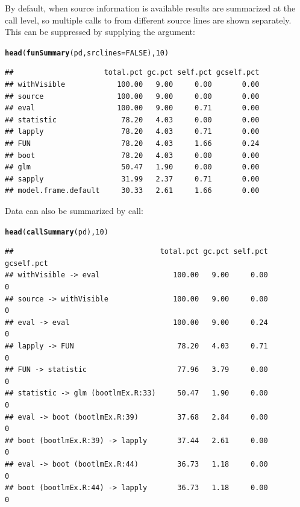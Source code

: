 \documentclass[nojss]{jss}\usepackage[]{graphicx}\usepackage[]{color}
\makeatletter
\newcommand{\hlnum}[1]{\textcolor[rgb]{0.686,0.059,0.569}{#1}}%
\newcommand{\hlstd}[1]{\textcolor[rgb]{0.345,0.345,0.345}{#1}}%
\newcommand{\hlkwc}[1]{\textcolor[rgb]{0.333,0.667,0.333}{#1}}%
\newcommand{\hlkwd}[1]{\textcolor[rgb]{0.737,0.353,0.396}{\textbf{#1}}}%
\newenvironment{kframe}{%
 \def\at@end@of@kframe{}%
 \ifinner\ifhmode%
  \def\at@end@of@kframe{\end{minipage}}%
  \begin{minipage}{\columnwidth}%
 \fi\fi%
 \def\FrameCommand##1{\hskip\@totalleftmargin \hskip-\fboxsep
 \colorbox{shadecolor}{##1}\hskip-\fboxsep
     \hskip-\linewidth \hskip-\@totalleftmargin \hskip\columnwidth}%
 \MakeFramed {\advance\hsize-\width
   \@totalleftmargin\z@ \linewidth\hsize
   \@setminipage}}%
 {\par\unskip\endMakeFramed%
 \at@end@of@kframe}
\newenvironment{knitrout}{}{} %
\makeatother
\begin{document}
By default, when source information is available results are
summarized at the call level, so multiple calls to  from
different source lines are shown separately. This can be suppressed by
supplying the  argument:
\begin{knitrout}\small
{}\color{fgcolor}\begin{kframe}
\begin{alltt}
\hlkwd{head}\hlstd{(}\hlkwd{funSummary}\hlstd{(pd,} \hlkwc{srclines} \hlstd{=} \hlnum{FALSE}\hlstd{),} \hlnum{10}\hlstd{)}
\end{alltt}
\begin{verbatim}
##                     total.pct gc.pct self.pct gcself.pct
## withVisible            100.00   9.00     0.00       0.00
## source                 100.00   9.00     0.00       0.00
## eval                   100.00   9.00     0.71       0.00
## statistic               78.20   4.03     0.00       0.00
## lapply                  78.20   4.03     0.71       0.00
## FUN                     78.20   4.03     1.66       0.24
## boot                    78.20   4.03     0.00       0.00
## glm                     50.47   1.90     0.00       0.00
## sapply                  31.99   2.37     0.71       0.00
## model.frame.default     30.33   2.61     1.66       0.00
\end{verbatim}
\end{kframe}
\end{knitrout}

Data can also be summarized by call:
\begin{knitrout}\small
{}\color{fgcolor}\begin{kframe}
\begin{alltt}
\hlkwd{head}\hlstd{(}\hlkwd{callSummary}\hlstd{(pd),} \hlnum{10}\hlstd{)}
\end{alltt}
\begin{verbatim}
##                                  total.pct gc.pct self.pct gcself.pct
## withVisible -> eval                 100.00   9.00     0.00          0
## source -> withVisible               100.00   9.00     0.00          0
## eval -> eval                        100.00   9.00     0.24          0
## lapply -> FUN                        78.20   4.03     0.71          0
## FUN -> statistic                     77.96   3.79     0.00          0
## statistic -> glm (bootlmEx.R:33)     50.47   1.90     0.00          0
## eval -> boot (bootlmEx.R:39)         37.68   2.84     0.00          0
## boot (bootlmEx.R:39) -> lapply       37.44   2.61     0.00          0
## eval -> boot (bootlmEx.R:44)         36.73   1.18     0.00          0
## boot (bootlmEx.R:44) -> lapply       36.73   1.18     0.00          0
\end{verbatim}
\end{kframe}
\end{knitrout}
\end{document}
